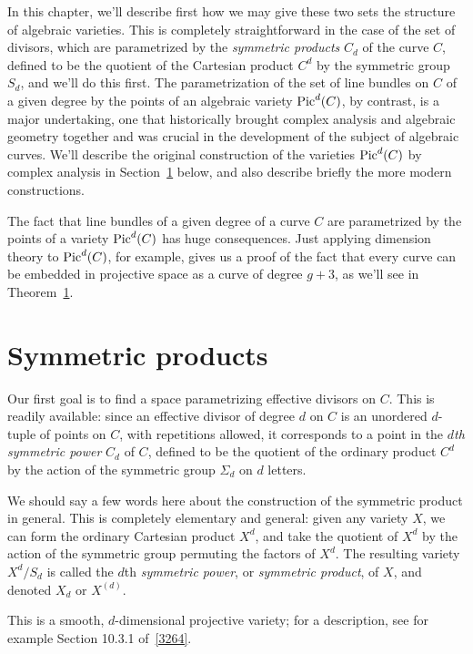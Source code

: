In this chapter, we'll describe first how we may give these two sets the structure of algebraic varieties. This is completely straightforward in the case of the set of divisors, which are parametrized by the \emph{symmetric products} $C_d$ of the curve $C$, defined to be the quotient of the Cartesian product $C^d$ by the symmetric group $S_d$, and we'll do this first. The parametrization of the set of line bundles on $C$ of a given degree by the points of an algebraic variety $\operatorname{Pic}^d(C)$, by contrast, is a major undertaking, one that historically brought complex analysis and algebraic geometry together and was crucial in the development of the subject of algebraic curves. We'll describe the original construction of the varieties $\operatorname{Pic}^d(C)$ by complex analysis in Section~\ref{} below, and also describe briefly the more modern constructions.

The fact that line bundles of a given degree of a curve $C$ are parametrized by the points of a variety $\operatorname{Pic}^d(C)$ has huge consequences. Just applying dimension theory to $\operatorname{Pic}^d(C)$, for example, gives us a proof of the fact that every curve can be embedded in projective space as a curve of degree $g+3$, as we'll see in Theorem~\ref{}.

\section{Symmetric products}

Our first goal is to find a space parametrizing effective divisors on $C$. This is readily available: since an effective divisor of degree $d$ on $C$ is an unordered $d$-tuple of points on $C$, with repetitions allowed, it corresponds to a point in the \emph{$d$th symmetric power} $C_d$ of $C$, defined to be the quotient of the ordinary product $C^d$ by the action of the symmetric group $\Sigma_d$ on $d$ letters. 

We should say a few words here about the construction of the symmetric product in general. This is completely elementary and general: given any variety $X$, we can form the ordinary Cartesian product $X^d$, and take the quotient of $X^d$ by the action of the symmetric group permuting the factors of $X^d$. The resulting variety $X^d/S_d$ is called the $d$th \emph{symmetric power}, or \emph{symmetric product}, of $X$, and denoted $X_d$ or $X^{(d)}$.

This is a smooth, $d$-dimensional projective variety; for a description, see for example Section 10.3.1 of~\ref{3264}.


